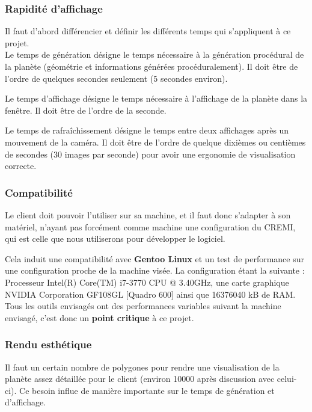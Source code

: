 \documentclass[a4paper]{article}
\begin{document}
\subsubsection{Rapidité d'affichage}
Il faut d'abord différencier et définir les différents temps qui s'appliquent à ce projet. \\
     
Le temps de génération désigne le temps nécessaire à la génération procédural de la planète (géométrie et informations générées procéduralement). Il doit être de l'ordre de quelques secondes seulement (5 secondes environ).
         
Le temps d'affichage désigne le temps nécessaire à l'affichage de la planète dans la fenêtre. Il doit être de l'ordre de la seconde.
         
Le temps de rafraîchissement désigne le temps entre deux affichages après un mouvement de la caméra. Il doit être de l'ordre de quelque dixièmes ou centièmes de secondes (30 images par seconde) pour avoir une ergonomie de visualisation correcte.
        
\subsubsection{Compatibilité} \label{Compatibilité}
        
Le client doit pouvoir l'utiliser sur sa machine, et il faut donc s'adapter à son matériel, n'ayant pas forcément comme machine une configuration du CREMI, qui est celle que nous utiliserons pour développer le logiciel.
        
Cela induit une compatibilité avec \textbf{Gentoo Linux} et un test de performance sur une configuration proche de la machine visée. La configuration étant la suivante : Processeur Intel(R) Core(TM) i7-3770 CPU @ 3.40GHz, une carte graphique NVIDIA Corporation GF108GL [Quadro 600] ainsi que 16376040 kB de RAM. Tous les outils envisagés ont des performances variables suivant la machine envisagé, c'est donc un \textbf{point critique} à ce projet.
        
\subsubsection{Rendu esthétique}
        
Il faut un certain nombre de polygones pour rendre une visualisation de la planète assez détaillée pour le client (environ 10000 après discussion avec celui-ci). Ce besoin influe de manière importante sur le temps de génération et d'affichage.
\end{document}
